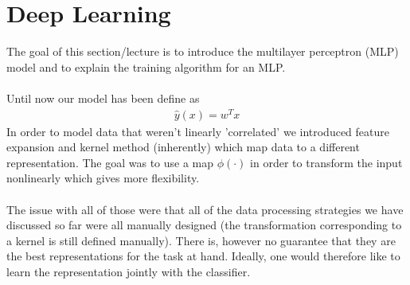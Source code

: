 
\section{Deep Learning}
The goal of this section/lecture is to introduce the multilayer perceptron (MLP) model and to explain the training algorithm for an MLP.\\
$ $\\
Until now our model has been define as 
\begin{align*} 
	\hat{y}\left(x\right) = w^{T}x
\end{align*}
In order to model data that weren't linearly 'correlated' we introduced feature expansion and kernel method (inherently) which map data to a different representation. The goal was to use a map $\phi\left(\cdot\right)$ in order to transform the input nonlinearly which gives more flexibility.\\
$ $\\
The issue with all of those were that all of the data processing strategies we have discussed so far were all manually designed (the transformation corresponding to a kernel is still defined manually). There is, however no guarantee that they are the best representations for the task at hand. Ideally, one would therefore like to learn the representation jointly with the classifier.

